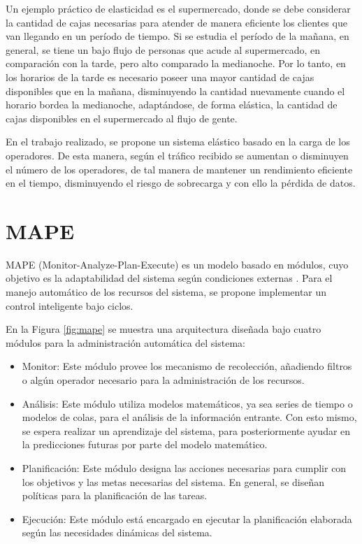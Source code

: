 Un ejemplo práctico de elasticidad es el supermercado, donde se debe considerar la cantidad de cajas necesarias para atender de manera eficiente los clientes que van llegando en un período de tiempo. Si se estudia el período de la mañana, en general, se tiene un bajo flujo de personas que acude al supermercado, en comparación con la tarde, pero alto comparado la medianoche. Por lo tanto, en los horarios de la tarde es necesario poseer una mayor cantidad de cajas disponibles que en la mañana, disminuyendo la cantidad nuevamente cuando el horario bordea la medianoche, adaptándose, de forma elástica, la cantidad de cajas disponibles en el supermercado al flujo de gente.

En el trabajo realizado, se propone un sistema elástico basado en la carga de los operadores. De esta manera, según el tráfico recibido se aumentan o disminuyen el número de los operadores, de tal manera de mantener \normalsize{un rendimiento eficiente} en el tiempo, disminuyendo el riesgo de sobrecarga y con ello la pérdida de datos.

\section{MAPE}
\label{sec:MAPE}
\normalsize{MAPE (Monitor-Analyze-Plan-Execute) es un modelo basado en módulos, cuyo objetivo es la adaptabilidad del sistema según condiciones externas} \citep{ibm2005architectural}. \normalsize{Para el manejo automático de los recursos del sistema, se propone implementar un control inteligente bajo ciclos.}

\normalsize{En la Figura} \ref{fig:mape} \normalsize{se muestra una arquitectura diseñada bajo cuatro módulos para la administración automática del sistema:}

\begin{itemize}
	\item \normalsize{Monitor: Este módulo provee los mecanismo de recolección, añadiendo filtros o algún operador necesario para la administración de los recursos.}
	\item \normalsize{Análisis: Este módulo utiliza modelos matemáticos, ya sea series de tiempo o modelos de colas, para el análisis de la información entrante. Con esto mismo, se espera realizar un aprendizaje del sistema, para posteriormente ayudar en la predicciones futuras por parte del modelo matemático.}
	\item \normalsize{Planificación: Este módulo designa las acciones necesarias para cumplir con los objetivos y las metas necesarias del sistema. En general, se diseñan políticas para la planificación de las tareas.}
	\item \normalsize{Ejecución: Este módulo está encargado en ejecutar la planificación elaborada según las necesidades dinámicas del sistema.}
\end{itemize}

